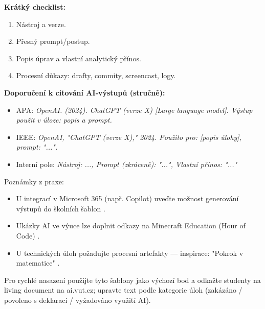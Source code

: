 \bigskip

\textbf{Krátký checklist:}
\begin{enumerate}
  \item Nástroj a verze.
  \item Přesný prompt/postup.
  \item Popis úprav a vlastní analytický přínos.
  \item Procesní důkazy: drafty, commity, screencast, logy.
\end{enumerate}

\bigskip

\textbf{Doporučení k citování AI‑výstupů (stručně):}
\begin{itemize}
  \item APA: \textit{OpenAI. (2024). ChatGPT (verze X) [Large language model]. Výstup použit v úloze: popis a prompt.}
  \item IEEE: \textit{OpenAI, "ChatGPT (verze X)," 2024. Použito pro: [popis úlohy], prompt: "...".}
  \item Interní pole: \textit{Nástroj: ..., Prompt (zkráceně): "...", Vlastní přínos: "..."}
\end{itemize}

\bigskip

Poznámky z praxe:
\begin{itemize}
  \item U integrací v Microsoft 365 (např. Copilot) uveďte možnost generování výstupů do školních šablon \cite{kb_ai_101_tipu_pdf_04e4a115_page_44_2}.
  \item Ukázky AI ve výuce lze doplnit odkazy na Minecraft Education (Hour of Code) \cite{kb_ai_101_tipu_pdf_04e4a115_page_15_2}.
  \item U technických úloh požadujte procesní artefakty — inspirace: "Pokrok v matematice" \cite{kb_ai_101_tipu_pdf_04e4a115_page_8_1}.
\end{itemize}

Pro rychlé nasazení použijte tyto šablony jako výchozí bod a odkažte studenty na living document na ai.vut.cz; upravte text podle kategorie úloh (zakázáno / povoleno s deklarací / vyžadováno využití AI).